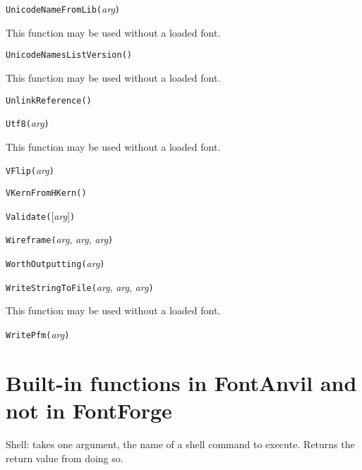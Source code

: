 \noindent\texttt{UnicodeNameFromLib(}\textit{arg}\texttt{)}

This function may be used without a loaded font.


\noindent\texttt{UnicodeNamesListVersion(}\texttt{)}

This function may be used without a loaded font.


\noindent\texttt{UnlinkReference(}\texttt{)}


\noindent\texttt{Utf8(}\textit{arg}\texttt{)}

This function may be used without a loaded font.


\noindent\texttt{VFlip(}\textit{arg}\texttt{)}


\noindent\texttt{VKernFromHKern(}\texttt{)}


\noindent\texttt{Validate(}[\textit{arg}]\texttt{)}


\noindent\texttt{Wireframe(}\textit{arg}, \textit{arg}, \textit{arg}\texttt{)}


\noindent\texttt{WorthOutputting(}\textit{arg}\texttt{)}


\noindent\texttt{WriteStringToFile(}\textit{arg}, \textit{arg}, \textit{arg}\texttt{)}

This function may be used without a loaded font.


\noindent\texttt{WritePfm(}\textit{arg}\texttt{)}

\section{Built-in functions in FontAnvil and not in FontForge}


Shell:  takes one argument, the name of a shell command to execute.  Returns
the return value from doing so.

